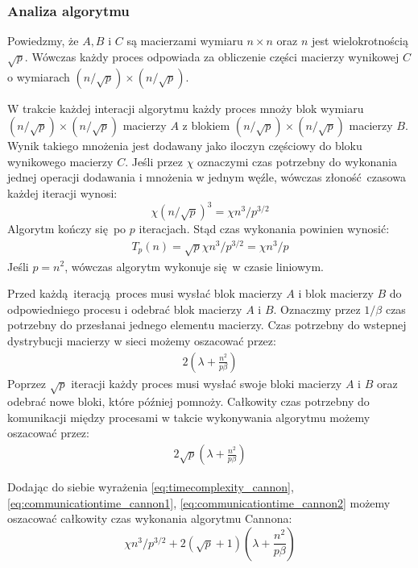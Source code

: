 \subsubsection{Analiza algorytmu}
Powiedzmy, że \(A, B\) i \(C\) są macierzami wymiaru \(n\times n\) oraz \(n\) jest wielokrotnością \(\sqrt{p}\). Wówczas każdy proces odpowiada za obliczenie części macierzy wynikowej \(C\) o wymiarach \((n/\sqrt{p}) \times (n/\sqrt{p})\).

W trakcie każdej interacji algorytmu każdy proces mnoży blok wymiaru \((n/\sqrt{p}) \times (n/\sqrt{p})\) macierzy \(A\) z blokiem \((n/\sqrt{p}) \times (n/\sqrt{p})\) macierzy \(B\). Wynik takiego mnożenia jest dodawany jako iloczyn częściowy do bloku wynikowego macierzy \(C\). Jeśli przez \(\chi\) oznaczymi czas potrzebny do wykonania jednej operacji dodawania i mnożenia w jednym węźle, wówczas złoność czasowa każdej iteracji wynosi:
\[
\chi (n/\sqrt{p})^3 = \chi n^3 / p^{3/2}
\]
\noindent Algorytm kończy się po \(p\) iteracjach. Stąd czas wykonania powinien wynosić:
\begin{align}\label{eq:timecomplexity_cannon}
T_p(n) = \sqrt{p} \chi n^3 / p^{3/2} = \chi n^3 / p
\end{align}
\noindent Jeśli \(p=n^2\), wówczas algorytm wykonuje się w czasie liniowym.

Przed każdą iteracją proces musi wysłać blok macierzy \(A\) i blok macierzy \(B\) do odpowiedniego procesu i odebrać blok macierzy \(A\) i \(B\). Oznaczmy przez \(1/\beta\) czas potrzebny do przesłanai jednego elementu macierzy. Czas potrzebny do wstepnej dystrybucji macierzy w sieci możemy oszacować przez:
\begin{align}\label{eq:communicationtime_cannon1}
2\left(\lambda + \frac{n^2}{p\beta}\right)
\end{align}
Poprzez \(\sqrt{p}\) iteracji każdy proces musi wysłać swoje bloki macierzy \(A\) i \(B\) oraz odebrać nowe bloki, które później pomnoży. Całkowity czas potrzebny do komunikacji między procesami w takcie wykonywania algorytmu możemy oszacować przez:
\begin{align}\label{eq:communicationtime_cannon2}
2\sqrt{p}\left(\lambda + \frac{n^2}{p\beta}\right)
\end{align}

\noindent Dodając do siebie wyrażenia \eqref{eq:timecomplexity_cannon}, \eqref{eq:communicationtime_cannon1}, \eqref{eq:communicationtime_cannon2} możemy oszacować całkowity czas wykonania algorytmu Cannona:
\[
\chi n^3 / p^{3/2} + 2(\sqrt{p}+1)\left(\lambda + \frac{n^2}{p\beta}\right)
\]


